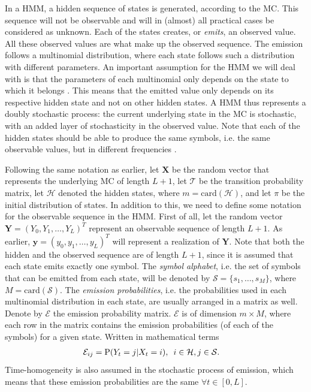 \documentclass{article}
\begin{document}
In a HMM, a hidden sequence of states is generated, according to the MC. This sequence will not be observable and will in (almost) all practical cases be considered as unknown. Each of the states creates, or \textit{emits}, an observed value. All these observed values are what make up the observed sequence. The emission follows a multinomial distribution, where each state follows such a distribution with different parameters. An important assumption for the HMM we will deal with is that the parameters of each multinomial only depends on the state to which it belongs \cite{Choo2004}. This means that the emitted value only depends on its respective hidden state and not on other hidden states. A HMM thus represents a doubly stochastic process: the current underlying state in the MC is stochastic, with an added layer of stochasticity in the observed value. Note that each of the hidden states should be able to produce the same symbols, i.e. the same observable values, but in different frequencies \cite{Christianini2006}.

Following the same notation as earlier, let $\mathbf{X}$ be the random vector that represents the underlying MC of length $L+1$, let $\mathcal{T}$ be the transition probability matrix, let $\mathcal{H}$ denoted the hidden states, where $m = \text{card}(\mathcal{H})$, and let $\pi$ be the initial distribution of states. In addition to this, we need to define some notation for the observable sequence in the HMM. First of all, let the random vector $\mathbf{Y} = (Y_0, Y_1, \ldots, Y_L)^T$ represent an observable sequence of length $L+1$. As earlier, $\mathbf{y} = (y_0, y_1, \ldots, y_L)^T$ will represent a realization of $\mathbf{Y}$. Note that both the hidden and the observed sequence are of length $L+1$, since it is assumed that each state emits exactly one symbol. The \textit{symbol alphabet}, i.e. the set of symbols that can be emitted from each state, will be denoted by $\mathcal{S} = \{s_1, \ldots, s_M\}$, where $M = \text{card}(\mathcal{S})$. The \textit{emission probabilities}, i.e. the probabilities used in each multinomial distribution in each state, are usually arranged in a matrix as well. Denote by $\mathcal{E}$ the emission probability matrix. $\mathcal{E}$ is of dimension $m \times M$, where each row in the matrix contains the emission probabilities (of each of the symbols) for a given state. Written in mathematical terms 
\begin{align*}
    \mathcal{E}_{ij} &= \text{P}(Y_t = j|X_t = i), \hspace{0.5em} i \in \mathcal{H}, j \in \mathcal{S}.
\end{align*}
Time-homogeneity is also assumed in the stochastic process of emission, which means that these emission probabilities are the same $\forall t \in [0, L]$. 
\end{document}
